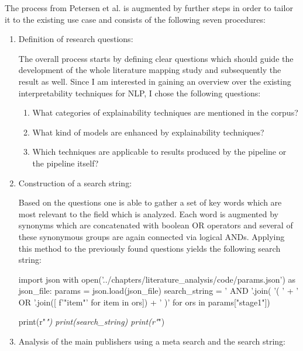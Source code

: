 The process from Petersen et al. is augmented by further steps in order to tailor it to the existing use case and consists of the following seven procedures:
\begin{enumerate}
	
	\item Definition of research questions:
	
	The overall process starts by defining clear questions which should guide the development of the whole literature mapping study and subsequently the result as well. Since I am interested in gaining an overview over the existing interpretability techniques for NLP, I chose the following questions:
	
	\begin{enumerate}
		\item What categories of explainability techniques are mentioned in the corpus?
		\item What kind of models are enhanced by explainability techniques?
		\item Which techniques are applicable to results produced by the pipeline or the pipeline itself?
	\end{enumerate}
	
	\item Construction of a search string:
	
	Based on the questions one is able to gather a set of key words which are most relevant to the field which is analyzed. Each word is augmented by synonyms which are concatenated with boolean OR operators and several of these synonymous groups are again connected via logical ANDs. Applying this method to the previously found questions yields the following search string:
	
\begin{pycode}
import json
with open('../chapters/literature_analysis/code/params.json') as json_file:
	params = json.load(json_file)
	search_string = ' AND '.join( '( ' + ' OR '.join([ f'"{item}"' for item in ors]) + ' )' for ors in params["stage1"])
	
	print(r"\textit{")
	print(search_string)
	print(r"}")
\end{pycode}
	
	
	\item Analysis of the main publishers using a meta search and the search string:
	

\end{enumerate}
